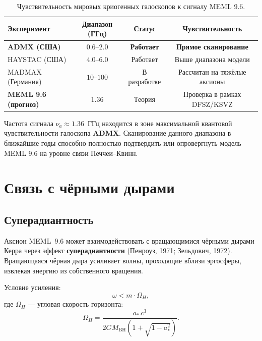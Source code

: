 \documentclass[12pt,a4paper]{article}
\begin{document}
\begin{table}[h!]
\centering
\caption{Чувствительность мировых криогенных галоскопов к сигналу MEML 9.6.}
\label{tab:haloscopes}
\begin{tabular}{lccc}
\toprule
\textbf{Эксперимент} & \textbf{Диапазон (ГГц)} & \textbf{Статус} & \textbf{Чувствительность} \\
\midrule
\textbf{ADMX (США)}   & $0.6$--$2.0$ & \textbf{Работает} & \textbf{Прямое сканирование} \\
HAYSTAC (США) & $4.0$--$6.0$ & Работает & Выше диапазона модели \\
MADMAX (Германия) & $10$--$100$ & В разработке & Рассчитан на тяжёлые аксионы \\
\midrule
\textbf{MEML 9.6 (прогноз)} & $\mathbf{1.36}$ & Теория & Проверка в рамках DFSZ/KSVZ \\
\bottomrule
\end{tabular}
\end{table}

Частота сигнала $\nu_a \approx 1.36$~ГГц находится в зоне максимальной квантовой чувствительности галоскопа \textbf{ADMX}. Сканирование данного диапазона в ближайшие годы способно полностью подтвердить или опровергнуть модель MEML 9.6 на уровне связи Печчеи--Квинн.

\section{Связь с чёрными дырами}
\label{sec:black-holes}

\subsection{Суперадиантность}
\label{subsec:superradiance}

Аксион MEML~9.6 может взаимодействовать с вращающимися чёрными дырами Керра через эффект \textbf{суперадиантности} (Пенроуз, 1971; Зельдович, 1972). Вращающаяся чёрная дыра усиливает волны, проходящие вблизи эргосферы, извлекая энергию из собственного вращения.

Условие усиления:
\begin{equation}
\omega < m \cdot \Omega_H,
\end{equation}
где $\Omega_H$ --- угловая скорость горизонта:
\begin{equation}
\Omega_H = \frac{a_*\,c^3}{2GM_{\text{BH}}\left(1 + \sqrt{1-a_*^2}\right)}.
\end{equation}
\end{document}

